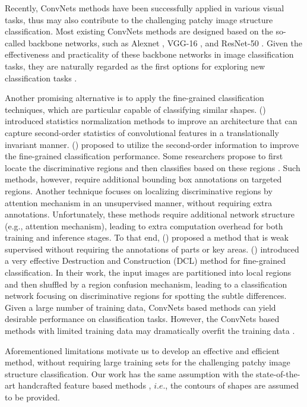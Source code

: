 \documentclass[letterpaper]{article} %
\begin{document}
Recently, ConvNets methods have been successfully applied in various visual tasks, thus may also contribute to the challenging patchy image structure classification. Most existing ConvNets methods are designed based on the so-called backbone networks, such as Alexnet \cite{52}, VGG-16 \cite{21}, and ResNet-50 \cite{34}. Given the effectiveness and practicality of these backbone networks in image classification tasks, they are naturally regarded as the first options for exploring new classification tasks \cite{wu2019ip102}.

Another promising alternative is to apply the fine-grained classification techniques, which are particular capable of classifying similar shapes. \citeauthor{lin2017improved} (\citeyear{lin2017improved}) introduced statistics normalization methods to improve an architecture that can capture second-order statistics of convolutional features in a translationally invariant manner. \citeauthor{li2018towards} (\citeyear{li2018towards}) proposed to utilize the second-order information to improve the fine-grained classification performance.
Some researchers propose to first locate the discriminative regions and then classifies based on these regions \cite{huang2016part}. Such methods, however, require additional bounding box annotations on targeted regions. Another technique focuses on localizing discriminative regions by attention mechanism in an unsupervised manner, without requiring extra annotations. Unfortunately, these methods \cite{zheng2017learning,fu2017look,Zheng_2019_CVPR} require additional network structure (e.g., attention mechanism), leading to extra computation overhead for both training and inference stages. To that end, \citeauthor{Yang2018Learning} (\citeyear{Yang2018Learning}) proposed a method that is weak supervised without requiring the annotations of parts or key areas. \citeauthor{chen2019destruction} (\citeyear{chen2019destruction}) introduced a very effective Destruction and Construction (DCL) method for fine-grained classification. In their work, the input images are partitioned into local regions and then shuffled by a region confusion mechanism, leading to a classification network focusing on discriminative regions for spotting the subtle differences. Given a large number of training data, ConvNets based methods can yield desirable performance on classification tasks. However, the ConvNets based methods with limited training data may dramatically overfit the training data \cite{37}.


Aforementioned limitations motivate us to develop an effective and efficient method, without requiring large training sets for the challenging patchy image structure classification. Our work has the same assumption with the state-of-the-art handcrafted feature based methods \cite{3,11,7,28,25,20,4}, $i.e.$, the contours of shapes are assumed to be provided.
\end{document}
